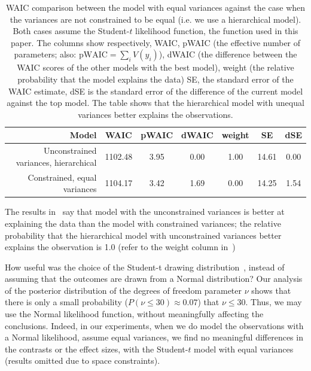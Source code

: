 \begin{table}[htb]%
    \centering
        \caption{WAIC comparison between the model with equal variances against the case when the variances are not constrained to be equal (i.e. we use a hierarchical model). Both cases assume the Student-$t$ likelihood function, the function used in this paper. The columns show respectively, WAIC, pWAIC (the effective number of parameters; also: $\mathrm{pWAIC}=\sum_i V(y_i)$), dWAIC (the difference between the WAIC scores of the other models with the best model), weight (the relative probability that the model explains the data) SE, the standard error of the WAIC estimate, dSE is the standard error of the difference of the current model against the top model. The table shows that the hierarchical model with unequal variances better explains the observations. }\label{tab:WAIC comparison}
        \begin{tabular}{rcccccc} \toprule
            Model & WAIC & pWAIC & dWAIC & weight & SE & dSE \\ \midrule
             Unconstrained variances, hierarchical    & 1102.48    & 3.95 &     0.00 &     1.00 &     14.61 &     0.00    \\
            Constrained, equal variances & 1104.17 & 3.42 & 1.69 & 0.00 & 14.25 & 1.54        \\ \bottomrule
        \end{tabular}
    
    \end{table}

The results in~ say that model with the unconstrained variances is better at explaining the data than the model with constrained variances; the relative probability that the hierarchical model with unconstrained variances better explains the observation is 1.0 (refer to the weight column in~)

How useful was the choice of the Student-t drawing distribution~, instead of assuming that the outcomes are drawn from a Normal distribution? Our analysis of the posterior distribution of the degrees of freedom parameter $\nu$ shows that there is only a small probability ($P(\nu \leq 30) \approx 0.07$) that $\nu \leq 30$. Thus, we may use the Normal likelihood function, without meaningfully affecting the conclusions. Indeed, in our experiments, when we do model the observations with a Normal likelihood, assume equal variances, we find no meaningful differences in the contrasts or the effect sizes, with the Student-$t$ model with equal variances (results omitted due to space constraints).

